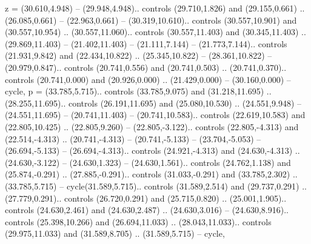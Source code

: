 {z} = {(30.610,4.948) -- (29.948,4.948).. controls (29.710,1.826) and (29.155,0.661) .. (26.085,0.661) -- (22.963,0.661) -- (30.319,10.610).. controls (30.557,10.901) and (30.557,10.954) .. (30.557,11.060).. controls (30.557,11.403) and (30.345,11.403) .. (29.869,11.403) -- (21.402,11.403) -- (21.111,7.144) -- (21.773,7.144).. controls (21.931,9.842) and (22.434,10.822) .. (25.345,10.822) -- (28.361,10.822) -- (20.979,0.847).. controls (20.741,0.556) and (20.741,0.503) .. (20.741,0.370).. controls (20.741,0.000) and (20.926,0.000) .. (21.429,0.000) -- (30.160,0.000) -- cycle},
{p} = {(33.785,5.715).. controls (33.785,9.075) and (31.218,11.695) .. (28.255,11.695).. controls (26.191,11.695) and (25.080,10.530) .. (24.551,9.948) -- (24.551,11.695) -- (20.741,11.403) -- (20.741,10.583).. controls (22.619,10.583) and (22.805,10.425) .. (22.805,9.260) -- (22.805,-3.122).. controls (22.805,-4.313) and (22.514,-4.313) .. (20.741,-4.313) -- (20.741,-5.133) -- (23.704,-5.053) -- (26.694,-5.133) -- (26.694,-4.313).. controls (24.921,-4.313) and (24.630,-4.313) .. (24.630,-3.122) -- (24.630,1.323) -- (24.630,1.561).. controls (24.762,1.138) and (25.874,-0.291) .. (27.885,-0.291).. controls (31.033,-0.291) and (33.785,2.302) .. (33.785,5.715) -- cycle(31.589,5.715).. controls (31.589,2.514) and (29.737,0.291) .. (27.779,0.291).. controls (26.720,0.291) and (25.715,0.820) .. (25.001,1.905).. controls (24.630,2.461) and (24.630,2.487) .. (24.630,3.016) -- (24.630,8.916).. controls (25.398,10.266) and (26.694,11.033) .. (28.043,11.033).. controls (29.975,11.033) and (31.589,8.705) .. (31.589,5.715) -- cycle},
